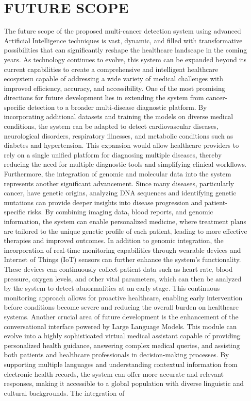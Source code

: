 \documentclass[a4paper,12pt]{report}
\begin{document}
\chapter{FUTURE SCOPE}
\label{chap:futurescope}
\begin{doublespace} 

The future scope of the proposed multi-cancer detection system using advanced Artificial Intelligence techniques is vast, dynamic, and filled with transformative possibilities that can significantly reshape the healthcare landscape in the coming years. As technology continues to evolve, this system can be expanded beyond its current capabilities to create a comprehensive and intelligent healthcare ecosystem capable of addressing a wide variety of medical challenges with improved efficiency, accuracy, and accessibility. One of the most promising directions for future development lies in extending the system from cancer-specific detection to a broader multi-disease diagnostic platform. By incorporating additional datasets and training the models on diverse medical conditions, the system can be adapted to detect cardiovascular diseases, neurological disorders, respiratory illnesses, and metabolic conditions such as diabetes and hypertension. This expansion would allow healthcare providers to rely on a single unified platform for diagnosing multiple diseases, thereby reducing the need for multiple diagnostic tools and simplifying clinical workflows. Furthermore, the integration of genomic and molecular data into the system represents another significant advancement. Since many diseases, particularly cancer, have genetic origins, analyzing DNA sequences and identifying genetic mutations can provide deeper insights into disease progression and patient-specific risks. By combining imaging data, blood reports, and genomic information, the system can enable personalized medicine, where treatment plans are tailored to the unique genetic profile of each patient, leading to more effective therapies and improved outcomes. In addition to genomic integration, the incorporation of real-time monitoring capabilities through wearable devices and Internet of Things (IoT) sensors can further enhance the system’s functionality. These devices can continuously collect patient data such as heart rate, blood pressure, oxygen levels, and other vital parameters, which can then be analyzed by the system to detect abnormalities at an early stage. This continuous monitoring approach allows for proactive healthcare, enabling early intervention before conditions become severe and reducing the overall burden on healthcare systems. Another crucial area of future development is the enhancement of the conversational interface powered by Large Language Models. This module can evolve into a highly sophisticated virtual medical assistant capable of providing personalized health guidance, answering complex medical queries, and assisting both patients and healthcare professionals in decision-making processes. By supporting multiple languages and understanding contextual information from electronic health records, the system can offer more accurate and relevant responses, making it accessible to a global population with diverse linguistic and cultural backgrounds. The integration of 
\end{doublespace}
\end{document}

